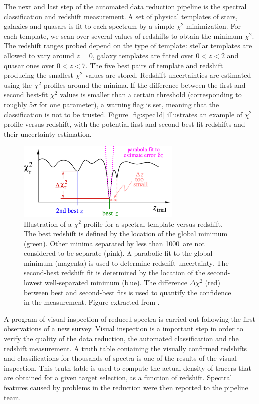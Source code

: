 The next and last step of the automated data reduction pipeline is the 
spectral classification and redshift measurement. 
A set of physical templates of stars, galaxies and quasars is fit to 
each spectrum by a simple $\chi^2$ minimization. For each template, 
we scan over several values of redshifts to obtain the minimum $\chi^2$. 
The redshift ranges probed depend on the type of template: 
stellar templates are allowed to vary around $z =0$, 
galaxy templates are fitted over $0 < z < 2$ and quasar ones over $0 < z < 7$. 
The five best pairs of template and redshift producing the smallest $\chi^2$ values are stored. 
Redshift uncertainties are estimated using the $\chi^2$ profiles around the minima.
If the difference between the first and second best-fit $\chi^2$ values
is smaller than a certain threshold (corresponding to roughly 
5$\sigma$ for one parameter), a warning flag is set, meaning 
that the classification is not to be trusted. 
Figure~\ref{fig:spec1d} illustrates an example of $\chi^2$ profile versus redshift,
with the potential first and second best-fit redshifts and their uncertainty estimation. 

\begin{figure}
    \centering
    \includegraphics[width=0.7\textwidth]{fig/spectro/spec1d_chi2.png}
    \caption{Illustration of a $\chi^2$ profile for a spectral template versus redshift. 
    The best redshift is defined by the location of the global minimum (green). 
    Other minima separated by less than 1000~\kms are not considered to be separate (pink). 
    A parabolic fit to the global minimum (magenta) is used to determine redshift uncertainty. 
    The second-best redshift fit is determined by the location of the second-lowest well-separated minimum (blue). 
    The difference $\Delta \chi^2$ (red) between best and second-best fits is used 
    to quantify the confidence in the measurement.
    Figure extracted from \cite{boltonSpectralClassificationRedshift2012a}. }
    \label{fig:flux_calibration_residuals}
\end{figure}

A program of visual inspection of reduced spectra is carried out following the first observations 
of a new survey. 
Visual inspection is a important step in order to verify 
the quality of the data reduction, the automated classification and the redshift measurement. 
A truth table containing the visually confirmed redshifts and classifications
for thousands of spectra is one of the results of the visual inspection. 
This truth table is used to compute the actual density of tracers that are 
obtained for a given target selection, as a function of redshift. 
Spectral features caused by problems in the reduction were then reported to the
pipeline team. 


